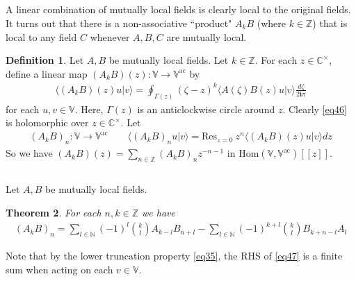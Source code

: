 \documentclass[12pt,b5paper,notitlepage]{article}
\theoremstyle{definition}
\newtheorem{df}{Definition}[section]
\theoremstyle{plain}
\newtheorem{thm}[df]{Theorem}
\newcommand{\Hom}{\mathrm{Hom}}
\newcommand{\Res}{\mathrm{Res}}
\newcommand{\bk}[1]{\langle {#1}\rangle}
\newcommand{\im}{\mathbf{i}}
\newcommand{\Vbb}{\mathbb V}
\newcommand{\Cbb}{\mathbb C}
\newcommand{\Nbb}{\mathbb N}
\newcommand{\Zbb}{\mathbb Z}
\newcommand{\ac}{\mathrm{ac}}
\numberwithin{equation}{section}
\begin{document}
\subsection{}



A linear combination of mutually local fields is clearly local to the original fields. It turns out that there is a non-associative ``product" $A_kB$ (where $k\in\Zbb$) that is local to any field $C$ whenever $A,B,C$ are mutually local. 

\begin{df}\label{lb24}
Let $A,B$ be mutually local fields. Let $k\in\Zbb$. For each $z\in\Cbb^\times$, define a linear map $(A_kB)(z):\Vbb\rightarrow\Vbb^\ac$  by
\begin{align}\label{eq46}
\bk{(A_kB)(z)u|v}=\oint_{\Gamma(z)}(\zeta-z)^k\bk{A(\zeta)B(z)u|v}\frac{d\zeta}{2\im\pi}
\end{align}
for each $u,v\in\Vbb$. Here, $\Gamma(z)$ is an anticlockwise circle around $z$. Clearly \eqref{eq46} is holomorphic over $z\in\Cbb^\times$. Let
\begin{align*}
(A_kB)_n:\Vbb\rightarrow\Vbb^\ac\qquad\bk{(A_kB)_nu|v}=\Res_{z=0}~z^n\bk{(A_kB)(z)u|v}dz
\end{align*}
So we have $(A_kB)(z)=\sum_{n\in\Zbb}(A_kB)_nz^{-n-1}$ in $\Hom(\Vbb,\Vbb^\ac)[[z]]$.
\end{df}


\subsection{}


Let $A,B$ be mutually local fields. 

\begin{thm}\label{lb25}
For each $n,k\in\Zbb$ we have
\begin{align}\label{eq47}
(A_kB)_n=\sum_{l\in\Nbb}(-1)^l{k\choose l}A_{k-l}B_{n+l}-\sum_{l\in\Nbb}(-1)^{k+l}{k\choose l}B_{k+n-l}A_l
\end{align}
\end{thm}

Note that by the lower truncation property \eqref{eq35}, the RHS of \eqref{eq47} is a finite sum when acting on each $v\in\Vbb$. 
\end{document}
